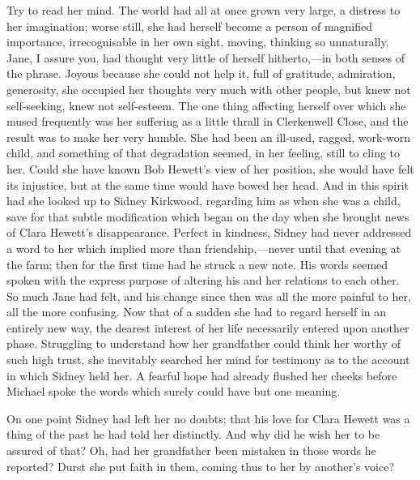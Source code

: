 {\protect\hypertarget{252}{}{}}Try to read her mind. The world had all
at once grown very large, a distress to her imagination; worse still,
she had herself become a person of magnified importance, irrecognisable
in her own sight, moving, thinking so unnaturally. Jane, I assure you,
had thought very little of herself hitherto,---in both senses of the
phrase. Joyous because she could not help it, full of gratitude,
admiration, generosity, she occupied her thoughts very much with other
people, but knew not self-seeking, knew not self-esteem. The one thing
affecting herself over which she mused frequently was her suffering as a
little thrall in Clerkenwell Close, and the result was to make her very
humble. She had been an ill-used, ragged, work-worn child, and something
of that degradation seemed, in her feeling, still to cling to her. Could
she have known Bob Hewett's view of her position, she would have felt
its injustice, but at the same time would have bowed her head. And in
this spirit had she looked up to Sidney Kirkwood, regarding him as when
she was a child, save for that subtle
{\protect\hypertarget{253}{}{}}modification which began on the day when
she brought news of Clara Hewett's disappearance. Perfect in kindness,
Sidney had never addressed a word to her which implied more than
friendship,---never until that evening at the farm; then for the first
time had he struck a new note. His words seemed spoken with the express
purpose of altering his and her relations to each other. So much Jane
had felt, and his change since then was all the more painful to her, all
the more confusing. Now that of a sudden she had to regard herself in an
entirely new way, the dearest interest of her life necessarily entered
upon another phase. Struggling to understand how her grandfather could
think her worthy of such high trust, she inevitably searched her mind
for testimony as to the account in which Sidney held her. A fearful hope
had already flushed her cheeks before Michael spoke the words which
surely could have but one meaning.

On one point Sidney had left her no doubts; that his love for Clara
Hewett was a thing of the past he had told her distinctly. And why
{\protect\hypertarget{254}{}{}}did he wish her to be assured of that?
Oh, had her grandfather been mistaken in those words he reported? Durst
she put faith in them, coming thus to her by another's voice?

